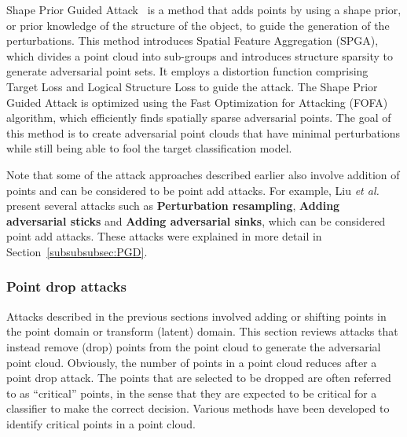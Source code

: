 \documentclass{ieeeaccess}
\def\etal{\textit{et al.}}
\begin{document}
Shape Prior Guided Attack~\cite{Shi2022Shape} is a method that adds points by using a shape prior, or prior knowledge of the structure of the object, to guide the generation of the perturbations. This method introduces Spatial Feature Aggregation (SPGA), which divides a point cloud into sub-groups and introduces structure sparsity to generate adversarial point sets. It employs a distortion function comprising Target Loss and Logical Structure Loss to guide the attack. The Shape Prior Guided Attack is optimized using the Fast Optimization for Attacking (FOFA) algorithm, which efficiently finds spatially sparse adversarial points. The goal of this method is to create adversarial point clouds that have minimal perturbations while still being able to fool the target classification model.

Note that some of the attack approaches described earlier also involve addition of points and can be considered to be point add attacks. For example, Liu \etal~\cite{liu2020adversarial} present several attacks such as \textbf{Perturbation resampling}, \textbf{Adding adversarial sticks} and \textbf{Adding adversarial sinks}, which can be considered point add attacks. These attacks were explained in more detail in Section~\ref{subsubsubsec:PGD}.

\subsubsection{Point drop attacks}
\label{subsubsec:Point drop attacks}

Attacks described in the previous sections %
involved adding or shifting points in the point domain or transform (latent) domain.  %
This section reviews attacks that instead remove (drop) points from the point cloud to generate the adversarial point cloud. Obviously, the number of points in a point cloud reduces after a point drop attack. The points that are selected to be dropped are often referred to as ``critical'' points, in the sense that they are expected to be critical for a classifier to make the correct decision. Various methods have been developed to identify critical points in a point cloud.  %
\end{document}
